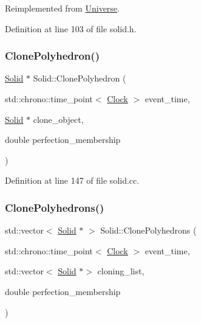 Reimplemented from \mbox{\hyperlink{class_universe_a46a906baabb63e5d31f8b48ea1fae52e}{Universe}}.



Definition at line 103 of file solid.\+h.

\mbox{\label{class_solid_ae83094e9c002a7574db242ed0bff6288}} 
\subsubsection{\texorpdfstring{Clone\+Polyhedron()}{ClonePolyhedron()}}
{\footnotesize\ttfamily \mbox{\hyperlink{class_solid}{Solid}} $\ast$ Solid\+::\+Clone\+Polyhedron (\begin{DoxyParamCaption}\item[{std\+::chrono\+::time\+\_\+point$<$ \mbox{\hyperlink{universe_8h_a0ef8d951d1ca5ab3cfaf7ab4c7a6fd80}{Clock}} $>$}]{event\+\_\+time,  }\item[{\mbox{\hyperlink{class_solid}{Solid}} $\ast$}]{clone\+\_\+object,  }\item[{double}]{perfection\+\_\+membership }\end{DoxyParamCaption})}



Definition at line 147 of file solid.\+cc.

\mbox{\label{class_solid_a1e650b6d8437acfaf7b9384b885d77bf}} 
\subsubsection{\texorpdfstring{Clone\+Polyhedrons()}{ClonePolyhedrons()}}
{\footnotesize\ttfamily std\+::vector$<$ \mbox{\hyperlink{class_solid}{Solid}} $\ast$ $>$ Solid\+::\+Clone\+Polyhedrons (\begin{DoxyParamCaption}\item[{std\+::chrono\+::time\+\_\+point$<$ \mbox{\hyperlink{universe_8h_a0ef8d951d1ca5ab3cfaf7ab4c7a6fd80}{Clock}} $>$}]{event\+\_\+time,  }\item[{std\+::vector$<$ \mbox{\hyperlink{class_solid}{Solid}} $\ast$$>$}]{cloning\+\_\+list,  }\item[{double}]{perfection\+\_\+membership }\end{DoxyParamCaption})}



